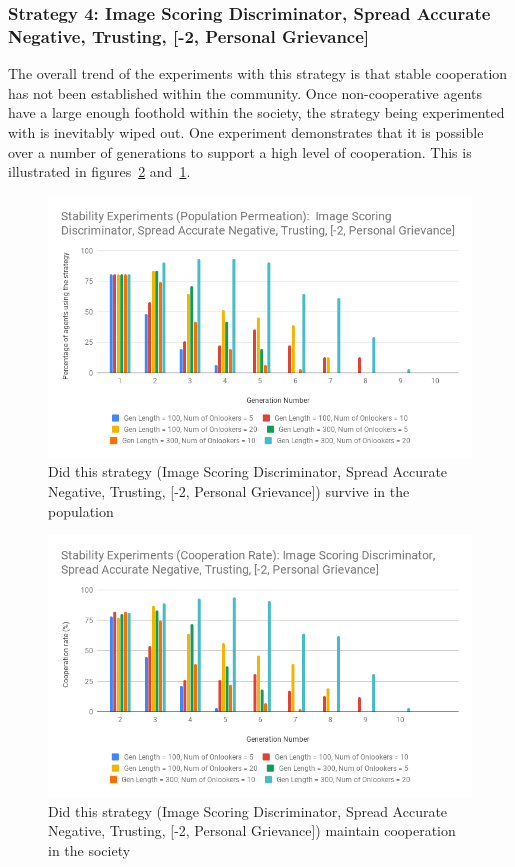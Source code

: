 \documentclass[]{final_report}
\begin{document}
\subsubsection{Strategy 4: Image Scoring Discriminator, Spread Accurate Negative, Trusting, [-2, Personal Grievance]}
The overall trend of the experiments with this strategy is that stable cooperation has not been established within the community. Once non-cooperative agents have a large enough foothold within the society, the strategy being experimented with is inevitably wiped out. One experiment demonstrates that it is possible over a number of generations to support a high level of cooperation. This is illustrated in figures~\ref{fig:isdsant-2pgCoop} and~\ref{fig:isdsant-2pgPop}.\begin{figure}
\begin{framed}
	\includegraphics[width=\textwidth]{isdsant-2pgPop.png}
	\caption{Did this strategy (Image Scoring Discriminator, Spread Accurate Negative, Trusting, [-2, Personal Grievance]) survive in the population}
	\label{fig:isdsant-2pgPop}
\end{framed}
\end{figure}
\begin{figure}
\begin{framed}
	\includegraphics[width=\textwidth]{isdsant-2pgCoop.png}
	\caption{Did this strategy (Image Scoring Discriminator, Spread Accurate Negative, Trusting, [-2, Personal Grievance]) maintain cooperation in the society}
	\label{fig:isdsant-2pgCoop}
\end{framed}
\end{figure}
\end{document}
